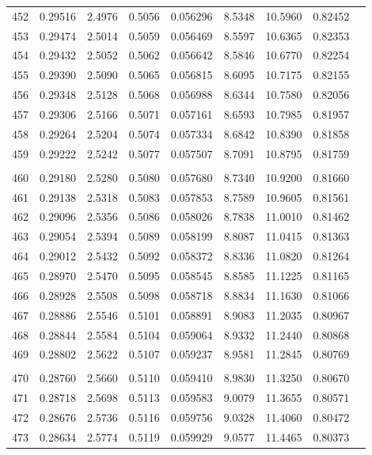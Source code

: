 \documentclass[letter,twosides,10pt]{article}
\begin{document}
\begin{longtable}{|c|c|c|c|c|c|c|c|c|}
452 & 0.29516 & 2.4976 & 0.5056 & 0.056296 & 8.5348 & 10.5960 & 0.82452 \\
453 & 0.29474 & 2.5014 & 0.5059 & 0.056469 & 8.5597 & 10.6365 & 0.82353 \\
454 & 0.29432 & 2.5052 & 0.5062 & 0.056642 & 8.5846 & 10.6770 & 0.82254 \\
455 & 0.29390 & 2.5090 & 0.5065 & 0.056815 & 8.6095 & 10.7175 & 0.82155 \\
456 & 0.29348 & 2.5128 & 0.5068 & 0.056988 & 8.6344 & 10.7580 & 0.82056 \\
457 & 0.29306 & 2.5166 & 0.5071 & 0.057161 & 8.6593 & 10.7985 & 0.81957 \\
458 & 0.29264 & 2.5204 & 0.5074 & 0.057334 & 8.6842 & 10.8390 & 0.81858 \\
459 & 0.29222 & 2.5242 & 0.5077 & 0.057507 & 8.7091 & 10.8795 & 0.81759 \\
 & & & & & & & \\
460 & 0.29180 & 2.5280 & 0.5080 & 0.057680 & 8.7340 & 10.9200 & 0.81660 \\
461 & 0.29138 & 2.5318 & 0.5083 & 0.057853 & 8.7589 & 10.9605 & 0.81561 \\
462 & 0.29096 & 2.5356 & 0.5086 & 0.058026 & 8.7838 & 11.0010 & 0.81462 \\
463 & 0.29054 & 2.5394 & 0.5089 & 0.058199 & 8.8087 & 11.0415 & 0.81363 \\
464 & 0.29012 & 2.5432 & 0.5092 & 0.058372 & 8.8336 & 11.0820 & 0.81264 \\
465 & 0.28970 & 2.5470 & 0.5095 & 0.058545 & 8.8585 & 11.1225 & 0.81165 \\
466 & 0.28928 & 2.5508 & 0.5098 & 0.058718 & 8.8834 & 11.1630 & 0.81066 \\
467 & 0.28886 & 2.5546 & 0.5101 & 0.058891 & 8.9083 & 11.2035 & 0.80967 \\
468 & 0.28844 & 2.5584 & 0.5104 & 0.059064 & 8.9332 & 11.2440 & 0.80868 \\
469 & 0.28802 & 2.5622 & 0.5107 & 0.059237 & 8.9581 & 11.2845 & 0.80769 \\
 & & & & & & & \\
470 & 0.28760 & 2.5660 & 0.5110 & 0.059410 & 8.9830 & 11.3250 & 0.80670 \\
471 & 0.28718 & 2.5698 & 0.5113 & 0.059583 & 9.0079 & 11.3655 & 0.80571 \\
472 & 0.28676 & 2.5736 & 0.5116 & 0.059756 & 9.0328 & 11.4060 & 0.80472 \\
473 & 0.28634 & 2.5774 & 0.5119 & 0.059929 & 9.0577 & 11.4465 & 0.80373 \\

\end{longtable}
\end{document}
